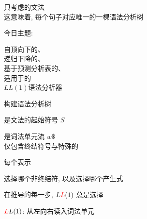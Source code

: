 
\begin{frame}{}
  \begin{center}
    只考虑的文法 \\[4pt]
    这意味着, 每个句子对应唯一的一棵语法分析树


    今日主题: 
  \end{center}
\end{frame}

\begin{frame}{}
  \begin{center}
    自顶向下的、\\[15pt]
    递归下降的、\\[15pt]
    基于预测分析表的、\\[15pt]
    适用于的 \\[15pt]
    $LL(1)$语法分析器
  \end{center}
\end{frame}

\begin{frame}{}
  \begin{center}
    {\large {}构建语法分析树}

    \vspace{0.60cm}
    是文法的起始符号 $S$


    \vspace{0.80cm}
    是词法单元流 $w\$$ \\[8pt]
    仅包含终结符号与特殊的
  \end{center}
\end{frame}

\begin{frame}{}
  \begin{center}
    每个表示

    \vspace{0.50cm}
     选择哪个非终结符, 以及选择哪个产生式

    \pause
    \vspace{1.50cm}
    在推导的每一步, $L\textcolor{red}{L}(1)$ 总是选择

    \pause
    \vspace{1.60cm}
    $\textcolor{red}{L}L(1)$: 从左向右读入词法单元
  \end{center}
\end{frame}

